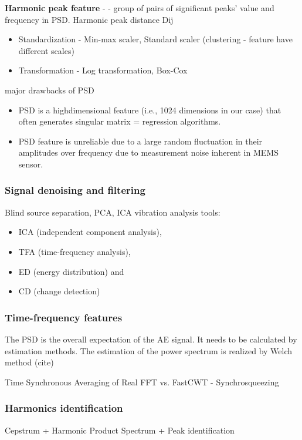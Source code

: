 \textbf{Harmonic peak feature} - \cite{jung_vibration_2017}- group of pairs of significant peaks’ value and frequency in PSD. Harmonic peak distance Dij

\begin{itemize}
\item Standardization - Min-max scaler, Standard scaler (clustering - feature have different scales)
\item Transformation - Log transformation, Box-Cox
\end{itemize}

major drawbacks of PSD
\begin{itemize}
	\item PSD is a highdimensional feature (i.e., 1024 dimensions in our case) that often generates singular matrix = regression algorithms.
	\item PSD feature is unreliable due to a large random fluctuation in their amplitudes over frequency due to measurement noise inherent in MEMS sensor.
\end{itemize}


\subsubsection{Signal denoising and filtering}
Blind source separation, PCA, ICA
vibration analysis tools:
\begin{itemize}
\item ICA (independent component analysis),
\item TFA (time-frequency analysis),
\item ED (energy distribution) and
\item CD (change detection)
\end{itemize}

\subsubsection{Time-frequency features}
The PSD is the overall expectation of the AE signal. It needs to be calculated by estimation methods. The estimation of the power spectrum is realized by Welch method (cite)

Time Synchronous Averaging of Real FFT
vs. FastCWT - Synchrosqueezing

\subsubsection{Harmonics identification}
Cepstrum + Harmonic Product Spectrum + Peak identification


